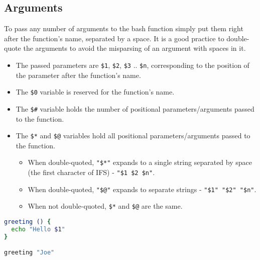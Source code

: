 \documentclass{article}
\newcommand{\inlinecode}[1]{\colorbox{backcolour}{\footnotesize{\texttt{#1}}}}
\begin{document}
\subsection{Arguments}

To pass any number of arguments to the bash function simply put them right after the function’s name, separated by a space. It is a good practice to double-quote the arguments to avoid the misparsing of an argument with spaces in it.

\begin{itemize}
	\item The passed parameters are \inlinecode{\$1}, \inlinecode{\$2}, \inlinecode{\$3} .. \inlinecode{\$n}, corresponding to the position of the parameter after the function’s name.
	\item The \inlinecode{\$0} variable is reserved for the function’s name.
	\item The \inlinecode{\$\#} variable holds the number of positional parameters/arguments passed to the function.
	\item The \inlinecode{\$*} and \inlinecode{\$@} variables hold all positional parameters/arguments passed to the function.
	      \begin{itemize}
		      \item When double-quoted, \inlinecode{"\$*"} expands to a single string separated by space (the first character of IFS) - \inlinecode{"\$1 \$2 \$n"}.
		      \item When double-quoted, \inlinecode{"\$@"} expands to separate strings - \inlinecode{"\$1" "\$2" "\$n"}.
		      \item When not double-quoted, \inlinecode{\$*} and \inlinecode{\$@} are the same.
	      \end{itemize}
\end{itemize}

\begin{lstlisting}[style=command, language=bash]
greeting () {
  echo "Hello $1"
}

greeting "Joe"
\end{lstlisting}
\end{document}
